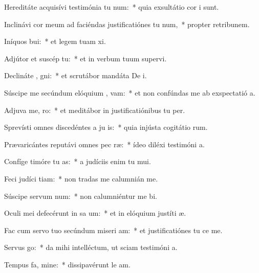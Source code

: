 \item Hereditáte acquisívi testimónia tu  num:~* quia exsultátio cor i sunt.
\item Inclinávi cor meum ad faciéndas justificatiónes tu  num,~* propter retribunem.
\item Iníquos  bui:~* et legem tuam xi.
\item Adjútor et suscép   tu:~* et in verbum tuum supervi.
\item Declináte  , gni:~* et scrutábor mandáta De i.
\item Súscipe me secúndum elóquium ,  vam:~* et non confúndas me ab exspectatió a.
\item Adjuva me,   ro:~* et meditábor in justificatiónibus tu per.
\item Sprevísti omnes discedéntes a ju is:~* quia injústa cogitátio rum.
\item Prævaricántes reputávi omnes pec ræ:~* ídeo diléxi testimóni a.
\item Confíge timóre tu  as:~* a judíciis enim tu mui.
\item Feci judíci  tiam:~* non tradas me calumnián me.
\item Súscipe servum   num:~* non calumniéntur me bi.
\item Oculi mei defecérunt in sa um:~* et in elóquium justíti æ.
\item Fac cum servo tuo secúndum miseri am:~* et justificatiónes tu ce me.
\item Servus   go:~* da mihi intelléctum, ut sciam testimóni a.
\item Tempus fa, mine:~* dissipavérunt le am.
